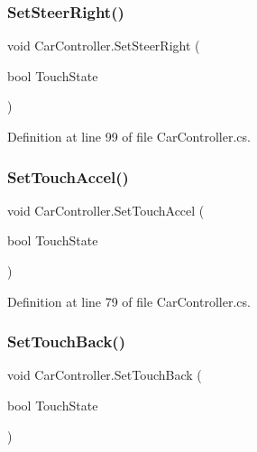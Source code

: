 \subsubsection{\texorpdfstring{Set\+Steer\+Right()}{SetSteerRight()}}
{\footnotesize\ttfamily void Car\+Controller.\+Set\+Steer\+Right (\begin{DoxyParamCaption}\item[{bool}]{Touch\+State }\end{DoxyParamCaption})\hspace{0.3cm}{\ttfamily [inline]}}



Definition at line 99 of file Car\+Controller.\+cs.

\mbox{\label{class_car_controller_ac889a3db559e21950d6291cfc72d072f}} 
\subsubsection{\texorpdfstring{Set\+Touch\+Accel()}{SetTouchAccel()}}
{\footnotesize\ttfamily void Car\+Controller.\+Set\+Touch\+Accel (\begin{DoxyParamCaption}\item[{bool}]{Touch\+State }\end{DoxyParamCaption})\hspace{0.3cm}{\ttfamily [inline]}}



Definition at line 79 of file Car\+Controller.\+cs.

\mbox{\label{class_car_controller_a653eab10dcc545076364510f8df2a2c4}} 
\subsubsection{\texorpdfstring{Set\+Touch\+Back()}{SetTouchBack()}}
{\footnotesize\ttfamily void Car\+Controller.\+Set\+Touch\+Back (\begin{DoxyParamCaption}\item[{bool}]{Touch\+State }\end{DoxyParamCaption})\hspace{0.3cm}{\ttfamily [inline]}}



